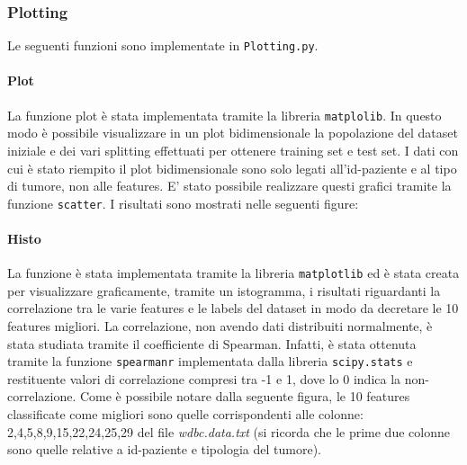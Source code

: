 \documentclass[11pt]{article}
\newenvironment{Shaded}{}{}
\newcommand{\DecValTok}[1]{\textcolor[rgb]{0.25,0.63,0.44}{{#1}}}
\newcommand{\StringTok}[1]{\textcolor[rgb]{0.25,0.44,0.63}{{#1}}}
\newcommand{\NormalTok}[1]{{#1}}
\newcommand{\SpecialCharTok}[1]{\textcolor[rgb]{0.25,0.44,0.63}{{#1}}}
\newcommand{\ControlFlowTok}[1]{\textcolor[rgb]{0.00,0.44,0.13}{\textbf{{#1}}}}
\newcommand{\OperatorTok}[1]{\textcolor[rgb]{0.40,0.40,0.40}{{#1}}}
\newcommand{\BuiltInTok}[1]{{#1}}
\begin{document}
\begin{Shaded}
\end{Shaded}

    \subsubsection{Plotting}\label{plotting}

    Le seguenti funzioni sono implementate in \texttt{Plotting.py}.

    \paragraph{Plot}\label{plot}

    La funzione plot è stata implementata tramite la libreria
\texttt{matplolib}. In questo modo è possibile visualizzare in un plot
bidimensionale la popolazione del dataset iniziale e dei vari splitting
effettuati per ottenere training set e test set. I dati con cui è stato
riempito il plot bidimensionale sono solo legati all'id-paziente e al
tipo di tumore, non alle features. E' stato possibile realizzare questi
grafici tramite la funzione \texttt{scatter}. I risultati sono mostrati
nelle seguenti figure: 

    \paragraph{Histo}\label{histo}

    La funzione è stata implementata tramite la libreria \texttt{matplotlib}
ed è stata creata per visualizzare graficamente, tramite un istogramma,
i risultati riguardanti la correlazione tra le varie features e le
labels del dataset in modo da decretare le 10 features migliori. La
correlazione, non avendo dati distribuiti normalmente, è stata studiata
tramite il coefficiente di Spearman. Infatti, è stata ottenuta tramite
la funzione \texttt{spearmanr} implementata dalla libreria
\texttt{scipy.stats} e restituente valori di correlazione compresi tra
-1 e 1, dove lo 0 indica la non-correlazione. Come è possibile notare
dalla seguente figura, le 10 features classificate come migliori sono
quelle corrispondenti alle colonne: 2,4,5,8,9,15,22,24,25,29 del file
\emph{wdbc.data.txt} (si ricorda che le prime due colonne sono quelle
relative a id-paziente e tipologia del tumore).
\end{document}
